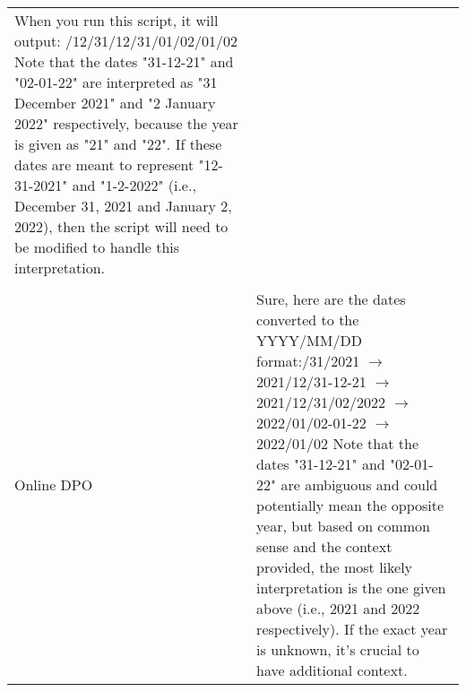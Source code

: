 \begin{CJK}{UTF8}{mj}
\begin{longtable}{lp{}}
When you run this script, it will output:\newline
\newline
\newline
2021/12/31\newline
2021/12/31\newline
2022/01/02\newline
2022/01/02\newline
Note that the dates "31-12-21" and "02-01-22" are interpreted as "31 December 2021" and "2 January 2022" respectively, because the year is given as "21" and "22". If these dates are meant to represent "12-31-2021" and "1-2-2022" (i.e., December 31, 2021 and January 2, 2022), then the script will need to be modified to handle this interpretation.
\\\\
Online DPO & 
Sure, here are the dates converted to the YYYY/MM/DD format:\newline\newline
12/31/2021 $\rightarrow$ 2021/12/31\newline
31-12-21 $\rightarrow$ 2021/12/31\newline
01/02/2022 $\rightarrow$ 2022/01/02\newline
02-01-22 $\rightarrow$ 2022/01/02\newline
Note that the dates "31-12-21" and "02-01-22" are ambiguous and could potentially mean the opposite year, but based on common sense and the context provided, the most likely interpretation is the one given above (i.e., 2021 and 2022 respectively). If the exact year is unknown, it's crucial to have additional context.
\\

\end{longtable}

\end{CJK}

